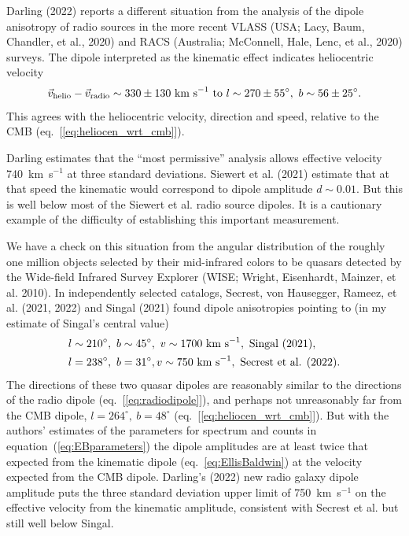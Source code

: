 \documentclass[fleqn,12pt]{article}
\newcommand{\beq}{\begin{equation}}
\newcommand{\eeq}{\end{equation}}
\begin{document}
Darling (2022) reports a different situation from the analysis of the dipole anisotropy of radio sources in the more recent VLASS (USA; Lacy, Baum, Chandler, et al., 2020) and RACS (Australia; McConnell, Hale, Lenc, et al., 2020) surveys. The dipole interpreted as the kinematic effect indicates heliocentric velocity
\beq
{\vec v}_{\rm helio} - {\vec v}_{\rm radio}  \sim 330\pm 130\hbox{ km s}^{-1}\hbox{ to } l \sim 270\pm 55^\circ,\ b \sim 56\pm 25^\circ.\label{eq:Darling}
\eeq
This agrees with the heliocentric velocity, direction and speed, relative to the CMB (eq.~[\ref{eq:heliocen_wrt_cmb}]).

Darling estimates that the ``most permissive'' analysis allows effective velocity 740~km~s$^{-1}$ at three standard deviations. Siewert et al. (2021) estimate that at that speed the kinematic would correspond to dipole amplitude $d\sim 0.01$. But this is well below most of the Siewert et al. radio source dipoles. It is a cautionary example of  the difficulty of establishing this important measurement. 

We have a check on this  situation from the angular distribution of the roughly one million objects selected by their mid-infrared colors to be quasars detected by the Wide-field Infrared Survey Explorer (WISE; Wright, Eisenhardt, Mainzer, et al. 2010). In independently selected catalogs, Secrest, von Hausegger, Rameez, et al. (2021, 2022) and Singal (2021) found dipole anisotropies pointing to (in my estimate of Singal's central value) 
\begin{align}
& l\sim 210^\circ,\ b\sim 45^\circ,\ v\sim 1700\hbox{ km s}^{-1},\hbox{ Singal (2021)},\nonumber\\
&l= 238^\circ,\ b=31^\circ, v \sim 750\hbox{ km s}^{-1},\hbox{ Secrest et al. (2022)}. \label{eq:kinematicdipole}
\end{align}
The directions of these two quasar dipoles are reasonably similar to the directions of the radio dipole (eq.~[\ref{eq:radiodipole}]), and perhaps not unreasonably far from the CMB dipole,  $l = 264^\circ,\ b=48^\circ$ (eq.~[\ref{eq:heliocen_wrt_cmb}]). But with the authors' estimates of the parameters for spectrum and counts in equation~(\ref{eq:EBparameters}) the dipole amplitudes are at least twice that expected from the kinematic dipole (eq.~\ref{eq:EllisBaldwin}) at the velocity expected from the CMB dipole. Darling's (2022) new radio galaxy dipole amplitude puts the three standard deviation upper limit of 750~km~s$^{-1}$ on the effective velocity from the kinematic amplitude, consistent with Secrest et al. but still well below Singal. 
\end{document}
